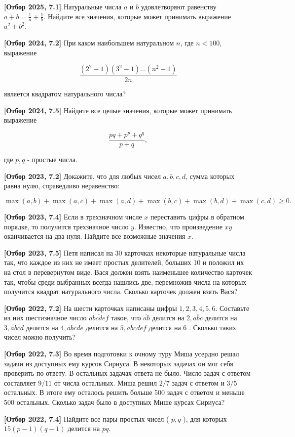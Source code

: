 \textbf{[Отбор 2025, 7.1]} 
Натуральные числа $a$ и $b$ удовлетворяют равенству $a+b=\frac{1}{a}+\frac{1}{b}$. Найдите все значения, которые может принимать выражение $a^2+b^2$.

\textbf{[Отбор 2024, 7.2]} 
При каком наибольшем натуральном $n$, где $n<100$, выражение

$$
\frac{\left(2^2-1\right)\left(3^2-1\right) \ldots\left(n^2-1\right)}{2 n}
$$


является квадратом натурального числа?

\textbf{[Отбор 2024, 7.5]}
Найдите все целые значения, которые может принимать выражение

$$
\frac{p q+p^p+q^q}{p+q},
$$


где $p, q$ - простые числа.

\textbf{[Отбор 2023, 7.2]}
Докажите, что для любых чисел $a, b, c, d$, сумма которых равна нулю, справедливо неравенство:

$$
\max (a, b)+\max (a, c)+\max (a, d)+\max (b, c)+\max (b, d)+\max (c, d) \geq 0 .
$$

\textbf{[Отбор 2023, 7.4]}
Если в трехзначном числе $x$ переставить цифры в обратном порядке, то получится трехзначное число $y$. Известно, что произведение $x y$ оканчивается на два нуля. Найдите все возможные значения $x$.


\textbf{[Отбор 2023, 7.5]}
Петя написал на 30 карточках некоторые натуральные числа так, что каждое из них не имеет простых делителей, больших 10 и положил их на стол в перевернутом виде. Вася должен взять наименьшее количество карточек так, чтобы среди выбранных всегда нашлись две, перемножив числа на которых получится квадрат натурального числа. Сколько карточек должен взять Вася?

\textbf{[Отбор 2022, 7.2]}
На шести карточках написаны цифры $1,2,3,4,5,6$. Составьте из них шестизначное число $\overline{a b c d e f}$ такое, что $\overline{a b}$ делится на $2, \overline{a b c}$ делится на $3, \overline{a b c d}$ делится на $4, \overline{a b c d e}$ делится на $5, \overline{a b c d e f}$ делится на 6 . Сколько таких чисел можно получить?

\newpage

\hspace{3mm}

\textbf{[Отбор 2022, 7.3]}
Во время подготовки к очному туру Миша усердно решал задачи из доступных ему курсов Сириуса. В некоторых задачах он мог себя проверить по ответу. В остальных задачах ответа не было. Число задач с ответом составляет $9 / 11$ от числа остальных. Миша решил $2 / 7$ задач с ответом и $3 / 5$ остальных. В итоге ему осталось решить больше 500 задач с ответом и меньше 500 остальных. Сколько задач было в доступных Мише курсах Сириуса?

\textbf{[Отбор 2022, 7.4]}
Найдите все пары простых чисел ( $p, q$ ), для которых $15(p-1)(q-1)$ делится на $p q$.